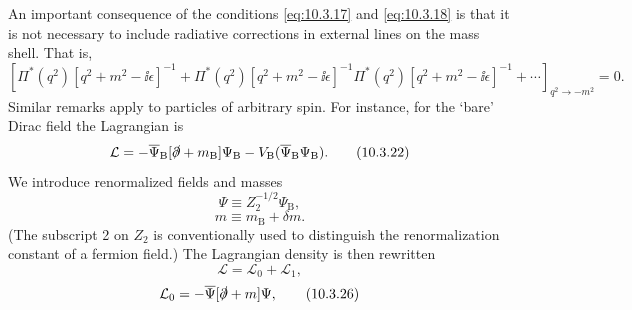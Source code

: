 An important consequence of the conditions \eqref{eq:10.3.17} and
\eqref{eq:10.3.18} is that it is not necessary to include radiative
corrections in external lines on the mass shell. That is,
\begin{equation}
\left[
\Pi^*(q^2)[q^2+m^2-\ii\epsilon]^{-1}
+\Pi^*(q^2)[q^2+m^2-\ii\epsilon]^{-1}\Pi^*(q^2)
[q^2+m^2-\ii\epsilon]^{-1}+\cdots
\right]_{q^2\to-m^2}=0.
\tag{10.3.21}\label{eq:10.3.21}
\end{equation}
Similar remarks apply to particles of arbitrary spin. For instance, for the
`bare' Dirac field the Lagrangian is
\begin{equation}
\mathcal L=-\overline\Psi_{\mathrm B}[\sl{\partial}+m_{\mathrm B}]\Psi_{\mathrm B}
-V_{\mathrm B}(\overline\Psi_{\mathrm B}\Psi_{\mathrm B}).
\tag{10.3.22}\label{eq:10.3.22}
\end{equation}
We introduce renormalized fields and masses
\begin{equation}
\Psi\equiv Z_2^{-1/2}\Psi_{\mathrm B},
\tag{10.3.23}\label{eq:10.3.23}
\end{equation}
\begin{equation}
m\equiv m_{\mathrm B}+\delta m.
\tag{10.3.24}\label{eq:10.3.24}
\end{equation}
(The subscript 2 on $Z_2$ is conventionally used to distinguish the
renormalization constant of a fermion field.) The Lagrangian density is then
rewritten
\begin{equation}
\mathcal L=\mathcal L_0+\mathcal L_1,
\tag{10.3.25}\label{eq:10.3.25}
\end{equation}
\begin{equation}
\mathcal L_0=-\overline\Psi[\sl{\partial}+m]\Psi,
\tag{10.3.26}\label{eq:10.3.26}
\end{equation}

